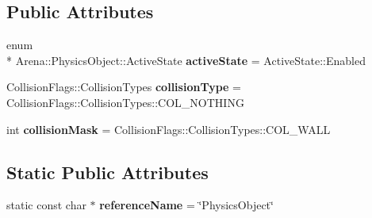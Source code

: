 \subsection*{Public Attributes}
\begin{DoxyCompactItemize}
\item 
\hypertarget{class_arena_1_1_physics_object_a6ea66a4167ec40c6a6e42304f333e4b9}{enum \\*
Arena\+::\+Physics\+Object\+::\+Active\+State {\bfseries active\+State} = Active\+State\+::\+Enabled}\label{class_arena_1_1_physics_object_a6ea66a4167ec40c6a6e42304f333e4b9}

\item 
\hypertarget{class_arena_1_1_physics_object_a5c51d2f7f8f4ea3484595cf0df5df39d}{Collision\+Flags\+::\+Collision\+Types {\bfseries collision\+Type} = Collision\+Flags\+::\+Collision\+Types\+::\+C\+O\+L\+\_\+\+N\+O\+T\+H\+I\+N\+G}\label{class_arena_1_1_physics_object_a5c51d2f7f8f4ea3484595cf0df5df39d}

\item 
\hypertarget{class_arena_1_1_physics_object_af218fdf9948bd046a16b078d1789bb38}{int {\bfseries collision\+Mask} = Collision\+Flags\+::\+Collision\+Types\+::\+C\+O\+L\+\_\+\+W\+A\+L\+L}\label{class_arena_1_1_physics_object_af218fdf9948bd046a16b078d1789bb38}

\end{DoxyCompactItemize}
\subsection*{Static Public Attributes}
\begin{DoxyCompactItemize}
\item 
\hypertarget{class_arena_1_1_physics_object_ae91e377385b599d597ec997158359820}{static const char $\ast$ {\bfseries reference\+Name} = \char`\"{}Physics\+Object\char`\"{}}\label{class_arena_1_1_physics_object_ae91e377385b599d597ec997158359820}

\end{DoxyCompactItemize}
